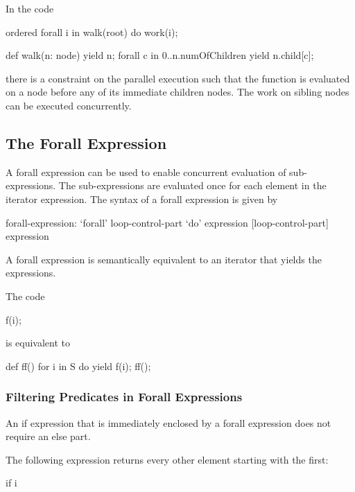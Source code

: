 \begin{example}
In the code
\begin{chapel}
ordered forall i in walk(root) do
  work(i);

def walk(n: node) {
  yield n;
  forall c in 0..n.numOfChildren {
      yield n.child[c];
  }
}
\end{chapel}
there is a constraint on the parallel execution such that the
function  is evaluated on a node before any of its
immediate children nodes.  The work on sibling nodes can be executed
concurrently.
\end{example}

\subsection{The Forall Expression}
\label{Forall_Expressions}

A forall expression can be used to enable concurrent evaluation of
sub-expressions.  The sub-expressions are evaluated once for each
element in the iterator expression.  The syntax of a forall expression
is given by
\begin{syntax}
forall-expression:
   `forall' loop-control-part `do' expression
   [loop-control-part] expression
\end{syntax}

A forall expression is semantically equivalent to an iterator that
yields the expressions.

\begin{example}
The code
\begin{chapel}
[i in S] f(i);
\end{chapel}
is equivalent to
\begin{chapel}
def ff() {
  for i in S do
    yield f(i);
}
ff();
\end{chapel}
\end{example}

\subsubsection{Filtering Predicates in Forall Expressions}
\label{Filtering_Predicates_Forall}

An if expression that is immediately enclosed by a forall expression
does not require an else part.
\begin{example}
The following expression returns every other element starting with the
first:
\begin{chapel}
[i in 1..s.length] if i %
\end{chapel}
\end{example}

